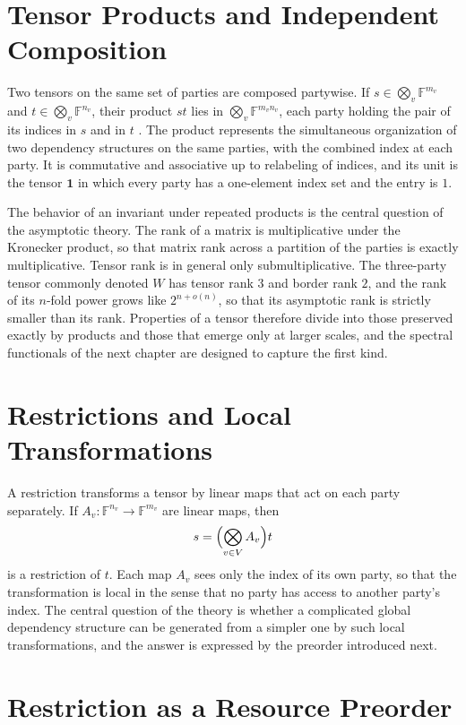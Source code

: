 \documentclass[11pt,letterpaper]{report}
\theoremstyle{plain}
\theoremstyle{definition}
\theoremstyle{remark}
\begin{document}
\section{Tensor Products and Independent Composition}

Two tensors on the same set of parties are composed partywise. If $s\in\bigotimes_v\mathbb F^{m_v}$ and $t\in\bigotimes_v\mathbb F^{n_v}$, their product $st$ lies in $\bigotimes_v\mathbb F^{m_vn_v}$, each party holding the pair of its indices in $s$ and in $t$ \cite{Source2026}. The product represents the simultaneous organization of two dependency structures on the same parties, with the combined index at each party. It is commutative and associative up to relabeling of indices, and its unit is the tensor $\mathbf 1$ in which every party has a one-element index set and the entry is $1$.

The behavior of an invariant under repeated products is the central question of the asymptotic theory. The rank of a matrix is multiplicative under the Kronecker product, so that matrix rank across a partition of the parties is exactly multiplicative. Tensor rank is in general only submultiplicative. The three-party tensor commonly denoted $W$ has tensor rank $3$ and border rank $2$, and the rank of its $n$-fold power grows like $2^{n+o(n)}$, so that its asymptotic rank is strictly smaller than its rank. Properties of a tensor therefore divide into those preserved exactly by products and those that emerge only at larger scales, and the spectral functionals of the next chapter are designed to capture the first kind.

\section{Restrictions and Local Transformations}

A restriction transforms a tensor by linear maps that act on each party separately. If $A_v:\mathbb F^{n_v}\to\mathbb F^{m_v}$ are linear maps, then
\[
s=\Bigl(\bigotimes_{v\in V}A_v\Bigr)t
\]
is a restriction of $t$. Each map $A_v$ sees only the index of its own party, so that the transformation is local in the sense that no party has access to another party's index. The central question of the theory is whether a complicated global dependency structure can be generated from a simpler one by such local transformations, and the answer is expressed by the preorder introduced next.

\section{Restriction as a Resource Preorder}
\end{document}
